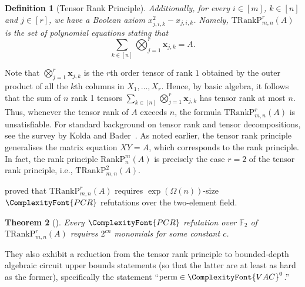 \documentclass[11pt,letter]{article}
\newtheorem{theorem}{Theorem}[section]
\newtheorem{definition}[theorem]{Definition}
\theoremstyle{remark} %
\newcommand{\RankP}{\mathrm{RankP}} %
\newcommand{\TRankP}{\mathrm{TRankP}} %
\newcommand{\perm}{{\rm perm}}
\newcommand{\IPS}{%
    {
        \ComplexityFont{IPS} 
    }
}
\newcommand{\PCR}{ %
    {
        \ComplexityFont{PCR}
    }
}
\newcommand{\x}{\mathbf{x}}
\newcommand{\F}{\mathbb{F}}
\newcommand{\VAC}{
    {
        \ComplexityFont{VAC}
    }
}
\begin{document}
{\begin{definition}[Tensor Rank Principle]
    Additionally, for every $i \in [m]$, $k \in [n]$ and $j \in [r]$, we have a Boolean axiom $x_{j,i,k}^2 - x_{j,i,k}$.
    Namely, $\TRankP_{m,n}^r(A)$ is the set of polynomial equations stating that
    \[
        \sum_{k \in [n]} \bigotimes_{j=1}^r \x_{j,k} = A.
    \]
\end{definition}
\bigskip 
    
    Note that $\bigotimes_{j=1}^r \x_{j,k}$ is the $r$th order tensor of rank $1$ obtained by the outer product of all the $k$th columns in $X_1,\dots,X_r$. Hence, by basic algebra, it follows that the sum of $n$ rank 1 tensors $\sum_{k \in [n]} \bigotimes_{j=1}^r \x_{j,k}$ has tensor rank at most $n$. Thus, whenever the tensor rank of $A$ exceeds $n$, the formula $\TRankP_{m,n}^r(A)$ is unsatisfiable. For standard background on tensor rank and tensor decompositions, see the survey by Kolda and Bader~\cite{KB09}. As noted earlier, the tensor rank principle generalises the matrix equation $XY = A$, which corresponds to the rank principle. In fact, the rank principle $\RankP_n^m(A)$ is precisely the case $r=2$ of the tensor rank principle, i.e., $\TRankP_{m,n}^2(A)$.

    \cite{GGLST25} proved that $\TRankP_{m,n}^r(A)$ requires $\exp(\Omega(n))$-size $\PCR$ refutations over the two-element field.

    \begin{theorem}[\cite{GGLST25}]
        \label{theorem: exp lower bound for TRankP}
        Every $\PCR$ refutation over $\F_2$ of $\TRankP_{m,n}^r(A)$ requires $2^{cn}$ monomials for some constant $c$.
    \end{theorem}
    
    They also exhibit a reduction from the tensor rank principle to bounded-depth algebraic circuit upper bounds statements (so that the latter are at least as hard as the former), specifically the statement “$\perm\in\VAC^0$.”
    

}
\end{document}
